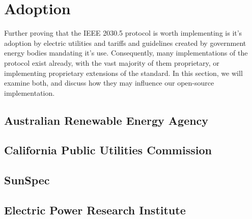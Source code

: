 \chapter{Adoption}\label{ch:adoption}

Further proving that the IEEE 2030.5 protocol is worth implementing is it's adoption by electric utilities and tariffs and guidelines created by government energy bodies mandating it's use.
Consequently, many implementations of the protocol exist already, with the vast majority of them proprietary, or implementing proprietary extensions of the standard.
In this section, we will examine both, and discuss how they may influence our open-source implementation. 

\section{Australian Renewable Energy Agency}


\section{California Public Utilities Commission}


\section{SunSpec}


\section{Electric Power Research Institute}





